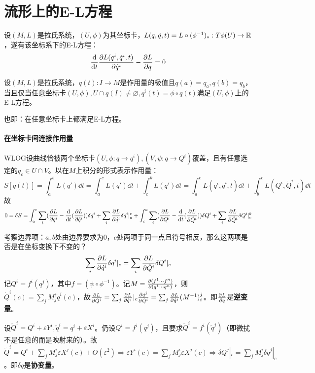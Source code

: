\documentclass{ctexbook}
\begin{document}

\section{流形上的E-L方程}
设$(M,L)$是拉氏系统，$(U,\phi)$为其坐标卡，$L(q,\dot q, t)=L\circ (\phi^{-1})_{*}:T\phi(U)\to \mathbb{R}$，遂有该坐标系下的E-L方程：
\[\frac{\mathrm{d}}{\mathrm{d}t}\frac{\partial L(q^{i},\dot q^{i},t)}{\partial \dot q^{i}}-\frac{\partial L}{\partial q}=0\]

\begin{Thm}
  设$(M,L)$是拉氏系统，$q(t):I\to M$是作用量的极值且$q(a)=q_{a},q(b)=q_{b}$，当且仅当任意坐标卡$(U,\phi),U\cap q(I)\neq \varnothing, q^{i}(t)=\phi\circ q(t)$满足$(U,\phi)$上的E-L方程。
\end{Thm}

也即：在任意坐标卡上都满足E-L方程。

\paragraph{在坐标卡间连接作用量}
WLOG设曲线恰被两个坐标卡$(U,\phi:q\to q^{i}), (V,\psi:q\to Q^{i})$覆盖，且有任意选定的$q_{c}\in U\cap V$。以在$M$上积分的形式表示作用量：
\[S[q(t)]=\int_{a}^{b}L(q')\dd t=\int_{a}^{c}L(q')\dd t+\int_{c}^{b}L(q')\dd t=\int_{a}^{c}L(q^{i},\dot q^{i},t)\dd t+\int_{b}^{c}L(Q^{i},\dot Q^{i},t)\dd t\]
故
\[0=\delta S=\int_{a}^{c}\sum_{i}(\frac{\partial L}{\partial q^{i}}-\frac{\mathrm{d}}{\mathrm{d}t}(\frac{\partial L}{\partial \dot q^{i}}))\delta q^{i}+\sum_{i}\frac{\partial L}{\partial \dot q^{i}}\delta q^{i}|_{a}^{c} +\int_{c}^{a}\sum_{i}(\frac{\partial L}{\partial Q^{i}}-\frac{\mathrm{d}}{\mathrm{d}t}(\frac{\partial L}{\partial \dot Q^{i}}))\delta Q^{i}+\sum_{i}\frac{\partial L}{\partial \dot Q^{i}}\delta Q^{i}|_{c}^{b} \]

考察边界项：$a,b$处由边界要求为0，$c$处两项于同一点且符号相反，那么这两项是否是在坐标变换下不变的？
\[\sum_{i}\frac{\partial L}{\partial \dot q^{i}}\delta q^{i}|_{c}=\sum_{i}\frac{\partial L}{\partial \dot Q^{i}}\delta Q^{i}|_{c}\]
记$Q^{i}=f^{i}(q^{j})$，其中$f=(\psi\circ\phi^{-1})$。记$M=\frac{\partial (f^{1}\cdots f^{n})}{\partial (q^{1}\cdots q^{n})}$，则$\dot Q^{i}(c)=\sum_{j}M_{j}^{i}\dot q^{i}(c)$，故$\frac{\partial L}{\partial \dot Q^{i}}=\sum_{j}\frac{\partial L}{\partial \dot q^{j}}|_{c}\frac{\partial \dot q^{j}}{\partial \dot Q^{i}}=\sum_{j}\frac{\partial L}{\partial \dot q^{j}}(M^{-1})_{i}^{j}$。即$\frac{\partial L}{\partial q}$是\textbf{逆变量}。

设$\tilde Q^{i}=Q^{i}+\varepsilon Y^{i},\tilde q^{i}=q^{i}+\varepsilon X^{i}$。仍设$Q^{i}=f^{i}(q^{j})$，且要求$\tilde Q^{i}=f^{i}(\tilde q^{j})$（即微扰不是任意的而是映射来的）。故$\tilde Q^{i}=Q^{i}+\sum_{j}M_{j}^{i}\varepsilon X^{j}(c)+O(\varepsilon^{2})\Rightarrow \varepsilon Y^{i}(c)=\sum_{j}M_{j}^{i}\varepsilon X^{j}(c)\Rightarrow \delta Q^{j}|_{c}=\sum_{j}M_{j}^{i}\delta q^{j}|_{c}$。即$\delta{q}$是\textbf{协变量}。
\end{document}
